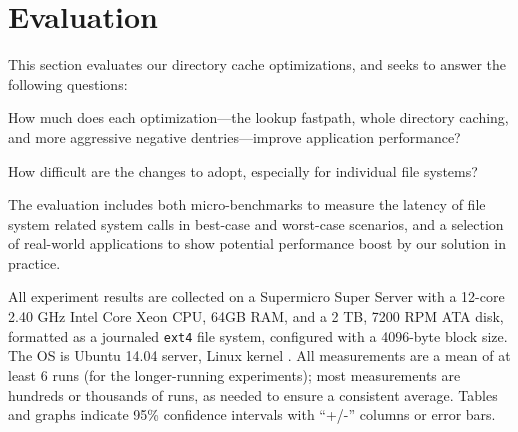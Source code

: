
\section{Evaluation}
\label{sec:dcache:eval}

This section evaluates our directory cache optimizations,
and seeks to answer the following questions:
\begin{compactenum}
\item How much does each optimization---the lookup fastpath, whole directory caching, and more aggressive negative dentries---improve application performance?  
\item How difficult are the changes to adopt, especially for individual file systems?
\end{compactenum}


The evaluation includes both 
micro-benchmarks to measure the latency of file system related system calls in best-case and worst-case scenarios,
and a selection of real-world applications to show potential performance boost by our solution in practice.


All experiment results are collected on a Supermicro Super Server with a 12-core 2.40 GHz Intel Core Xeon CPU, 64GB RAM, and a 2 TB, 7200 RPM ATA disk,
formatted as a journaled {\tt ext4} file system, configured with a 4096-byte block size.
The OS is Ubuntu 14.04 server, Linux kernel \linuxver{}. 
All measurements are a mean of at least 6 runs (for the longer-running experiments);
most measurements are hundreds or thousands of runs, as needed to ensure a consistent average.
Tables and graphs indicate 
95\% confidence intervals 
with ``+/-'' columns or error bars.

